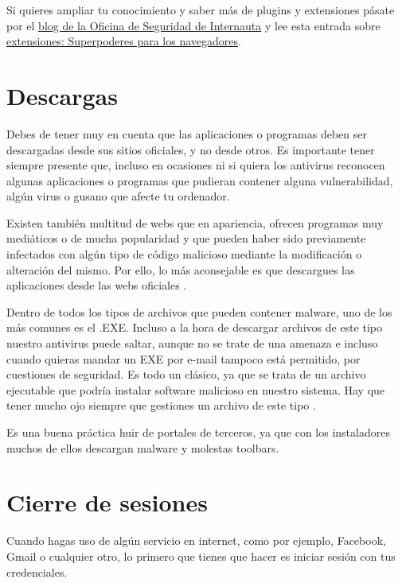 \documentclass[
  spanish,
  a4paper,
  openany]{book}
\begin{document}
Si quieres ampliar tu conocimiento y saber más de plugins y extensiones pásate por el \href{https://www.osi.es/es/actualidad/blog}{blog de la Oficina de Seguridad de Internauta} y lee esta entrada sobre \href{https://www.osi.es/es/actualidad/blog/2019/11/20/extensiones-superpoderes-para-los-navegadores}{extensiones: Superpoderes para los navegadores}.

\hypertarget{descargas}{%
\section{Descargas}\label{descargas}}

Debes de tener muy en cuenta que las aplicaciones o programas deben ser descargadas desde sus sitios oficiales, y no desde otros. Es importante tener siempre presente que, incluso en ocasiones ni si quiera los antivirus reconocen algunas aplicaciones o programas que pudieran contener alguna vulnerabilidad, algún virus o gusano que afecte tu ordenador.

Existen también multitud de webs que en apariencia, ofrecen programas muy mediáticos o de mucha popularidad y que pueden haber sido previamente infectados con algún tipo de código malicioso mediante la modificación o alteración del mismo. Por ello, lo más aconsejable es que descargues las aplicaciones desde las webs oficiales \citep{software-alterado}.

Dentro de todos los tipos de archivos que pueden contener malware, uno de los más comunes es el .EXE. Incluso a la hora de descargar archivos de este tipo nuestro antivirus puede saltar, aunque no se trate de una amenaza e incluso cuando quieras mandar un EXE por e-mail tampoco está permitido, por cuestiones de seguridad. Es todo un clásico, ya que se trata de un archivo ejecutable que podría instalar software malicioso en nuestro sistema. Hay que tener mucho ojo siempre que gestiones un archivo de este tipo \citep{RZ-exe}.

Es una buena práctica huir de portales de terceros, ya que con los instaladores muchos de ellos descargan malware y molestas toolbars.

\hypertarget{cierre-de-sesiones}{%
\section{Cierre de sesiones}\label{cierre-de-sesiones}}

Cuando hagas uso de algún servicio en internet, como por ejemplo, Facebook, Gmail o cualquier otro, lo primero que tienes que hacer es iniciar sesión con tus credenciales.
\end{document}
